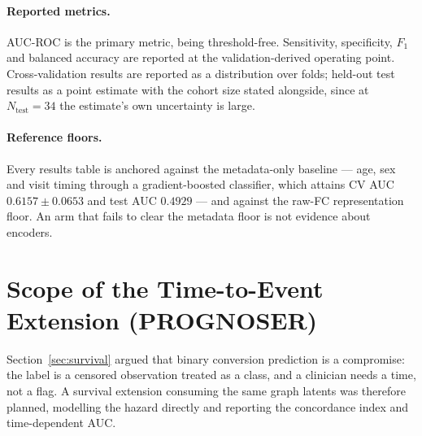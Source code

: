 \paragraph{Reported metrics.} AUC-ROC is the primary metric, being threshold-free.
Sensitivity, specificity, $F_1$ and balanced accuracy are reported at the
validation-derived operating point. Cross-validation results are reported as a distribution
over folds; held-out test results as a point estimate with the cohort size stated alongside,
since at $N_{\text{test}} = 34$ the estimate's own uncertainty is large.

\paragraph{Reference floors.} Every results table is anchored against the metadata-only
baseline --- age, sex and visit timing through a gradient-boosted classifier, which attains
CV AUC $0.6157 \pm 0.0653$ and test AUC $0.4929$ --- and against the raw-FC representation
floor. An arm that fails to clear the metadata floor is not evidence about encoders.

\section{Scope of the Time-to-Event Extension (PROGNOSER)}
\label{sec:prognoser-scope}

Section~\ref{sec:survival} argued that binary conversion prediction is a compromise: the
label is a censored observation treated as a class, and a clinician needs a time, not a
flag. A survival extension consuming the same graph latents was therefore planned, modelling
the hazard directly and reporting the concordance index and time-dependent AUC.

